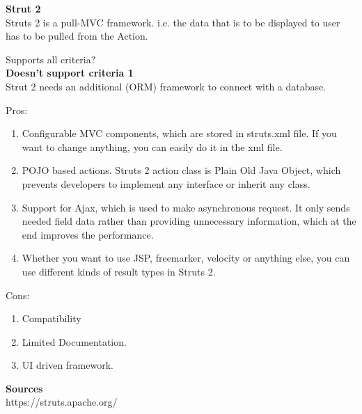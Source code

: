 		\textbf{Strut 2} \\
		Struts 2 is a pull-MVC framework. i.e. the data that is to be displayed to user has to be pulled from the Action.
		
		Supports all criteria?\\
		\textbf{Doesn't support criteria 1}\\
	 	Strut 2 needs an additional (ORM) framework  to connect with a database.


		
		Pros:
		\begin{enumerate}
			\item Configurable MVC components, which are stored in struts.xml file. If you want to change anything, you can easily do it in the xml file.
			\item POJO based actions. Struts 2 action class is Plain Old Java Object, which prevents developers to implement any interface or inherit any class.
			\item Support for Ajax, which is used to make asynchronous request. It only sends needed field data rather than providing unnecessary information, which at the end improves the performance.
			\item Whether you want to use JSP, freemarker, velocity or anything else, you can use different kinds of result types in Struts 2.
		\end{enumerate}
		Cons:
		\begin{enumerate}
			\item Compatibility
			\item Limited Documentation.
			\item UI driven framework.
		\end{enumerate}
	
	\textbf{Sources}\\
	https://struts.apache.org/